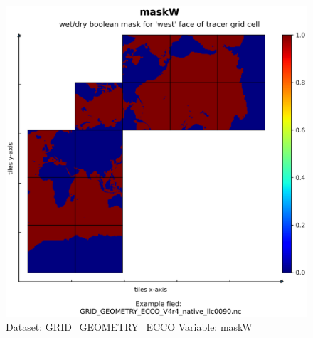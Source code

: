 \begin{figure}[H]
\centering
\includegraphics[scale=0.55]{../images/plots/native_plots_coords/Geometry_Parameters_for_the_Lat-Lon-Cap_90_(llc90)_Native_Model_Grid_(Version_4_Release_4)/maskW.png}
\caption{Dataset: GRID\_GEOMETRY\_ECCO Variable: maskW}
\label{tab:table-GRID_GEOMETRY_ECCO_maskW-Plot}
\end{figure}
\pagebreak
